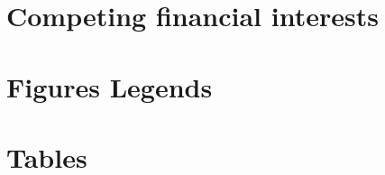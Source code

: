 \documentclass[english]{article}
\begin{document}
\section*{Competing financial interests}


\section*{Figures Legends}


\section*{Tables}

\end{document}
